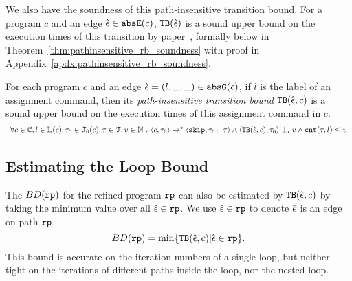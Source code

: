 We also have the soundness of this path-insensitive transition bound. For a program $c$ and an edge $\hat{\mathtt{\epsilon}{}} \in \mathtt{abs}{\mathtt{E}}(c)$,
${\mathtt{TB}}(\hat{\mathtt{\epsilon}{}})$ is a sound upper bound
on the execution times of this transition by paper~\cite{sinn2017complexity}, formally below in Theorem~\ref{thm:pathinsensitive_rb_soundness} with proof in Appendix~\ref{apdx:pathinsensitive_rb_soundness}.
%
\begin{thm}
  \label{thm:pathinsensitive_rb_soundness}
For each program ${c}$ and an edge $\hat{\mathtt{\epsilon}{}} = (l, \_, \_) \in \mathtt{abs}{\mathtt{G}}(c)$, if $l$ is the label of an assignment command,
then its \emph{path-insensitive transition bound} ${\mathtt{TB}}(\hat{\mathtt{\epsilon}{}}, c)$ 
 is a sound upper bound on 
the execution times of this assignment command in $c$.
  \[
    \begin{array}{l}
      \forall c \in \mathcal{C}, l \in \mathbb{L}(c),\mathtt{\tau}_0 \in \mathcal{T}_0(c), 
      \mathtt{\tau} \in \mathcal{T}, v \in \mathbb{N}
       ~.~ 
       \langle {c}, \mathtt{\tau}_0 \rangle \to^{*} \langle \mathtt{skip}, \mathtt{\tau}_0{\scriptscriptstyle ++}\mathtt{\tau} \rangle 
       \land \langle {\ensuremath{\mathtt{TB}}}(\hat{\mathtt{\epsilon}{}}, c), \mathtt{\tau}_0 \rangle \Downarrow_a v
       \land
      \mathtt{cnt}(\mathtt{\tau}, l) \leq v
    \end{array}
    \]
\end{thm}
%

\subsection{Estimating the Loop Bound} 
The $BD(\mathtt{rp})$ for the refined program $\mathtt{rp}$ can also be estimated by ${\mathtt{TB}}(\hat{\mathtt{\epsilon}{}}, c)$ by taking the
minimum value over all $\hat{\mathtt{\epsilon}{}} \in \mathtt{rp}$.
We use $\hat{\mathtt{\epsilon}{}} \in \mathtt{rp}$ to denote $\hat{\mathtt{\epsilon}{}}$ is an edge on path $\mathtt{rp}$.
\begin{equation}
  \label{eq:absBD}
  BD(\rprog) = \min\left\{ \absclr(\absevent, c) \middle\vert \absevent \in \rprog \right\}.
\end{equation}
%
This bound is accurate on the iteration numbers of a single loop, but neither tight on the iterations of different paths inside the loop, nor the nested loop.
%